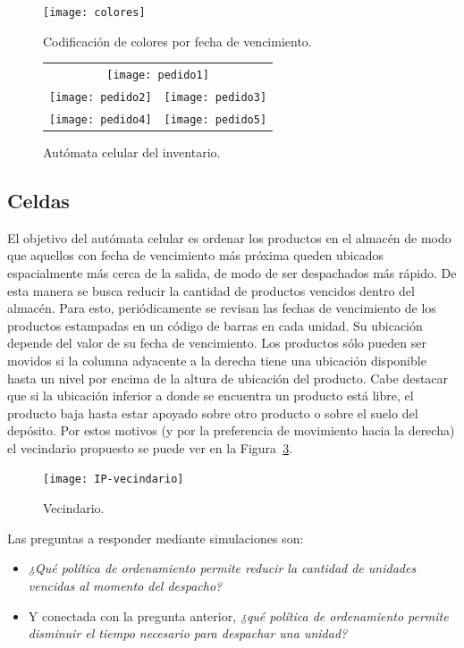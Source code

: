 \documentclass[10pt]{article}
\begin{document}
 \begin{figure}[h] 
 	\centering 
 	\texttt{[image: colores]} 
 	\caption{Codificación de colores por fecha de vencimiento.} 
 	\label{fig:AC-colores} 
 \end{figure}
 
 \begin{figure}[h] 
 \centering
 
 	\begin{tabular}{cc}
 		\multicolumn{2}{c}{\texttt{[image: pedido1]}}\\[5mm]
 		\texttt{[image: pedido2]} &
 		\texttt{[image: pedido3]} \\[5mm]
 		\texttt{[image: pedido4]} &
 		\texttt{[image: pedido5]} \\
 	\end{tabular}
 	
 	\caption{Autómata celular del inventario.} 
 	\label{fig:AC-inventario} 
 \end{figure}
 \FloatBarrier
 
\subsection{Celdas}

El objetivo del autómata celular es ordenar los productos en el almacén de modo que aquellos con fecha de vencimiento más próxima queden ubicados espacialmente más cerca de la salida, de modo de ser despachados más rápido. De esta manera se busca reducir la cantidad de productos vencidos dentro del almacén. Para esto, periódicamente se revisan las fechas de vencimiento de los productos estampadas en un código de barras en cada unidad. Su ubicación depende del valor de su fecha de vencimiento. Los productos sólo pueden ser movidos si la columna adyacente a la derecha tiene una ubicación disponible hasta un nivel por encima de la altura de ubicación del producto.
Cabe destacar que si la ubicación inferior a donde se encuentra un producto está libre, el producto baja hasta estar apoyado sobre otro producto o sobre el suelo del depósito.
Por estos motivos (y por la preferencia de movimiento hacia la derecha) el vecindario propuesto se puede ver en la Figura~\ref{fig:AC-vecindario}.

\begin{figure}[h] 
  \centering 
  \texttt{[image: IP-vecindario]} 
  \caption{Vecindario.} 
  \label{fig:AC-vecindario} 
\end{figure}
\FloatBarrier

Las preguntas a responder mediante simulaciones son:
\begin{itemize}
\item \textit{¿Qué política de ordenamiento permite reducir la cantidad de unidades vencidas al momento del despacho?}
\item Y conectada con la pregunta anterior, \textit{¿qué política de ordenamiento permite disminuir el tiempo necesario para despachar una unidad?}
\end{itemize}
\end{document}
